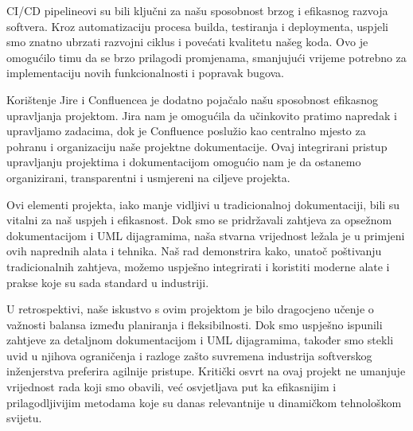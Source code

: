 		CI/CD pipelineovi su bili ključni za našu sposobnost brzog i efikasnog razvoja softvera. Kroz automatizaciju procesa builda, testiranja i deploymenta, uspjeli smo znatno ubrzati razvojni ciklus i povećati kvalitetu našeg koda. Ovo je omogućilo timu da se brzo prilagodi promjenama, smanjujući vrijeme potrebno za implementaciju novih funkcionalnosti i popravak bugova.

		Korištenje Jire i Confluencea je dodatno pojačalo našu sposobnost efikasnog upravljanja projektom. Jira nam je omogućila da učinkovito pratimo napredak i upravljamo zadacima, dok je Confluence poslužio kao centralno mjesto za pohranu i organizaciju naše projektne dokumentacije. Ovaj integrirani pristup upravljanju projektima i dokumentacijom omogućio nam je da ostanemo organizirani, transparentni i usmjereni na ciljeve projekta.

		Ovi elementi projekta, iako manje vidljivi u tradicionalnoj dokumentaciji, bili su vitalni za naš uspjeh i efikasnost. Dok smo se pridržavali zahtjeva za opsežnom dokumentacijom i UML dijagramima, naša stvarna vrijednost ležala je u primjeni ovih naprednih alata i tehnika. Naš rad demonstrira kako, unatoč poštivanju tradicionalnih zahtjeva, možemo uspješno integrirati i koristiti moderne alate i prakse koje su sada standard u industriji.

		U retrospektivi, naše iskustvo s ovim projektom je bilo dragocjeno učenje o važnosti balansa između planiranja i fleksibilnosti. Dok smo uspješno ispunili zahtjeve za detaljnom dokumentacijom i UML dijagramima, također smo stekli uvid u njihova ograničenja i razloge zašto suvremena industrija softverskog inženjerstva preferira agilnije pristupe. Kritički osvrt na ovaj projekt ne umanjuje vrijednost rada koji smo obavili, već osvjetljava put ka efikasnijim i prilagodljivijim metodama koje su danas relevantnije u dinamičkom tehnološkom svijetu.
		\eject 